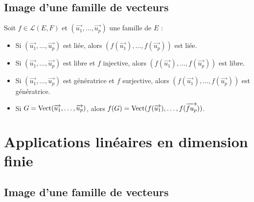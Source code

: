   \subsection{Image d'une famille de vecteurs}\label{subsec:image-d'une-famille-de-vecteurs}
    
    Soit $f \in \mathcal{L}(E, F)$ et $(\vec{u_1}, \dots, \vec{u_p})$ une famille de $E$ :
    \begin{itemize}
      \item Si $(\vec{u_1}, \dots, \vec{u_p})$ est liée, alors $(f(\vec{u_1}), \dots, f(\vec{u_p}))$ est liée.
      \item Si $(\vec{u_1}, \dots, \vec{u_p})$ est libre et $f$ injective, alors $(f(\vec{u_1}), \dots, f(\vec{u_p}))$ est libre.
      \item Si $(\vec{u_1}, \dots, \vec{u_p})$ est génératrice et $f$ surjective, alors $(f(\vec{u_1}), \dots, f(\vec{u_p}))$ est génératrice.
      \item Si $G = \operatorname{Vect}(\overrightarrow{u_1}, \dots, \overrightarrow{u_p})$, alors $f(G) = \operatorname{Vect}(f(\overrightarrow{u_1}), \dots, f(\overrightarrow{fu_p}))$.
    \end{itemize}


\section{Applications linéaires en dimension finie}\label{sec:applications-lineaires-en-dimension-finie}
  
  \subsection{Image d'une famille de vecteurs}\label{subsec:image-d'une-famille-de-vecteurs2}
    
